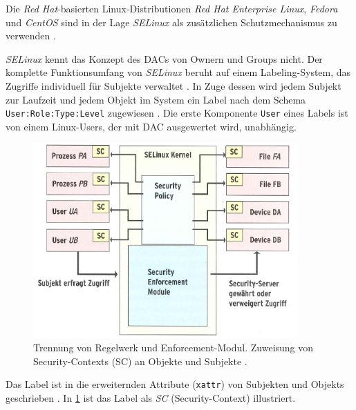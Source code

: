 \documentclass[../main.tex]{subfiles}
\begin{document}
				Die \emph{Red Hat}-basierten Linux-Distributionen \emph{Red Hat Enterprise Linux}, \emph{Fedora} und \emph{CentOS} sind in der Lage \emph{SELinux} als zusätzlichen Schutzmechanismus zu verwenden \cite{dockerSecurity}.

				\emph{SELinux} kennt das Konzept des DACs von Ownern und Groups nicht. Der komplette Funktionsumfang von \emph{SELinux} beruht auf einem Labeling-System, das Zugriffe individuell für Subjekte verwaltet \cite{SELinuxComic}. In Zuge dessen wird jedem Subjekt zur Laufzeit und jedem Objekt im System ein Label nach dem Schema \texttt{User:Role:Type:Level} zugewiesen \cite{atomicDockerSELinux}. Die erste Komponente \texttt{User} eines Labels ist von einem Linux-Users, der mit \acrshort{DAC} ausgewertet wird, unabhängig.

				\begin{figure}[h]
						\centering
						\includegraphics[width=0.9\textwidth]{./images/sec_SELinux.jpg}
						\caption{Trennung von Regelwerk und Enforcement-Modul. Zuweisung von Security-Contexts (SC) an Objekte und Subjekte \cite[S.63]{linuxMagazineSec}.}
						\label{fig:sec_SELinux}
				\end{figure}

				Das Label ist in die erweiternden Attribute (\texttt{xattr}) von Subjekten und Objekts geschrieben \cite[S.65]{linuxMagazineSec}. In \fig \ref{fig:sec_SELinux} ist das Label als \emph{SC} (Security-Context) illustriert.

\end{document}
